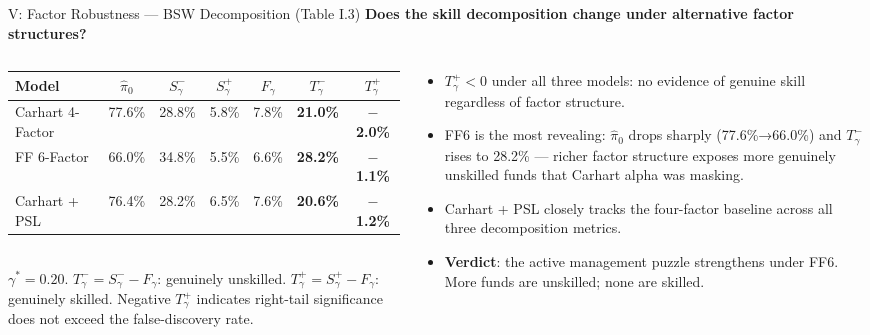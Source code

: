 \documentclass[10pt, aspectratio=169]{beamer}
\begin{document}
\begin{frame}{V: Factor Robustness — BSW Decomposition (Table I.3)}
  \small\textbf{Does the skill decomposition change under alternative factor structures?}
  \vspace{4pt}\\
  \begin{columns}[c]
    \begin{column}{0.54\textwidth}
      \scriptsize
      \renewcommand{\arraystretch}{1.25}
      \begin{tabular}{lcccccc}
        \toprule
        Model & $\hat{\pi}_0$ & $S^-_\gamma$ & $S^+_\gamma$ & $F_\gamma$ & $T^-_\gamma$ & $T^+_\gamma$ \\
        \midrule
        Carhart 4-Factor & 77.6\% & 28.8\% & 5.8\% & 7.8\% & \textbf{21.0\%} & \textbf{$-$2.0\%} \\
        FF 6-Factor      & 66.0\% & 34.8\% & 5.5\% & 6.6\% & \textbf{28.2\%} & \textbf{$-$1.1\%} \\
        Carhart + PSL    & 76.4\% & 28.2\% & 6.5\% & 7.6\% & \textbf{20.6\%} & \textbf{$-$1.2\%} \\
        \bottomrule
      \end{tabular}
      \renewcommand{\arraystretch}{1}
      \vspace{3pt}\\
      \tiny $\gamma^* = 0.20$. $T^-_\gamma = S^-_\gamma - F_\gamma$: genuinely unskilled.
      $T^+_\gamma = S^+_\gamma - F_\gamma$: genuinely skilled.
      Negative $T^+_\gamma$ indicates right-tail significance does not
      exceed the false-discovery rate.
    \end{column}
    \begin{column}{0.43\textwidth}
      \footnotesize
      \begin{itemize}\itemsep4pt
        \item $T^+_\gamma < 0$ under all three models: \alert{no evidence of
              genuine skill regardless of factor structure.}
        \item FF6 is the most revealing: $\hat{\pi}_0$ drops sharply
              (77.6\%→66.0\%) and $T^-_\gamma$ rises to 28.2\% — richer
              factor structure exposes more genuinely unskilled funds that
              Carhart alpha was masking.
        \item Carhart + PSL closely tracks the four-factor baseline across
              all three decomposition metrics.
        \item \textbf{Verdict}: the active management puzzle strengthens
              under FF6. More funds are unskilled; none are skilled.
      \end{itemize}
    \end{column}
  \end{columns}
\end{frame}
\end{document}
